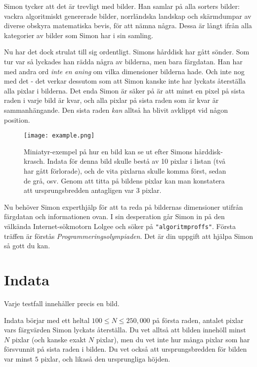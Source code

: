 
Simon tycker att det är trevligt med bilder. Han samlar på alla sorters bilder:
vackra algoritmiskt genererade bilder, norrländska landskap och skärmdumpar av
diverse obskyra matematiska bevis, för att nämna några. Dessa är långt ifrån
alla kategorier av bilder som Simon har i sin samling.

Nu har det dock strulat till sig ordentligt. Simons hårddisk har gått sönder.
Som tur var så lyckades han rädda några av bilderna, men bara färgdatan. Han
har med andra ord \emph{inte en aning} om vilka dimensioner bilderna hade. Och
inte nog med det - det verkar dessutom som att Simon kanske inte har lyckats
återställa alla pixlar i bilderna. Det enda Simon är säker på är att minst en
pixel på sista raden i varje bild är kvar, och alla pixlar på sista raden som
är kvar är sammanhängande. Den sista raden \emph{kan} alltså ha blivit avklippt
vid någon position.

\begin{figure}[ht!]
\centering
\texttt{[image: example.png]}
\caption{Miniatyr-exempel på hur en bild kan se ut efter Simons hårddisk-krasch. Indata
för denna bild skulle bestå av 10 pixlar i listan (två har gått förlorade), och de vita
pixlarna skulle komma först, sedan de grå, osv. Genom att titta på bildens pixlar kan
man konstatera att ursprungsbredden antagligen var 3 pixlar.}
\end{figure}

Nu behöver Simon experthjälp för att ta reda på bildernas dimensioner utifrån
färgdatan och informationen ovan. I sin desperation går Simon in på den
välkända Internet-sökmotorn Lolgee och söker på \texttt{"algoritmproffs"}.
Första träffen är förstås \emph{Programmeringsolympiaden}. Det är din uppgift
att hjälpa Simon så gott du kan.

\section*{Indata}
Varje testfall innehåller precis en bild.

Indata börjar med ett heltal $100 \leq N \leq 250,000$ på första raden, antalet pixlar vars
färgvärden Simon lyckats återställa. Du vet alltså att bilden innehöll minst
$N$ pixlar (och kanske exakt $N$ pixlar), men du vet inte hur många pixlar som
har försvunnit på sista raden i bilden. Du vet också att ursprungsbredden för
bilden var minst $5$ pixlar, och likaså den ursprungliga höjden.

